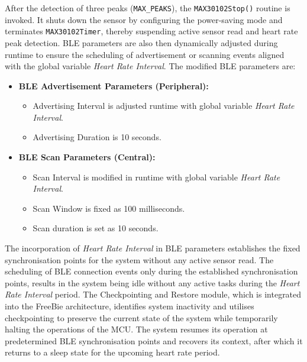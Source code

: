 \noindent After the detection of three peaks (\texttt{MAX\_PEAKS}), the \texttt{MAX30102Stop()} routine is invoked. It shuts down the sensor by configuring the power-saving mode and terminates \texttt{MAX30102Timer}, thereby suspending active sensor read and heart rate peak detection. BLE parameters are also then dynamically adjusted during runtime to ensure the scheduling of advertisement or scanning events aligned with the global variable \textit{Heart Rate Interval}. The modified BLE parameters are:
\begin{itemize}
    \item \textbf{BLE Advertisement Parameters (Peripheral):}
        \begin{itemize}
            \item Advertising Interval is adjusted runtime with global variable \textit{Heart Rate Interval}.
            \item Advertising Duration is 10 seconds.
        \end{itemize}
    \item \textbf{BLE Scan Parameters (Central):}
        \begin{itemize}
            \item Scan Interval is modified in runtime with global variable \textit{Heart Rate Interval}.
            \item Scan Window is fixed as 100 milliseconds.
            \item Scan duration is set as 10 seconds.
        \end{itemize}
\end{itemize}

\noindent The incorporation of \textit{Heart Rate Interval} in BLE parameters establishes the fixed synchronisation points for the system without any active sensor read. The scheduling of BLE connection events only during the established synchronisation points, results in the system being idle without any active tasks during the \textit{Heart Rate Interval} period. The Checkpointing and Restore module, which is integrated into the FreeBie architecture, identifies system inactivity and utilises checkpointing to preserve the current state of the system while temporarily halting the operations of the MCU. The system resumes its operation at predetermined BLE synchronisation points and recovers its context, after which it returns to a sleep state for the upcoming heart rate period.


